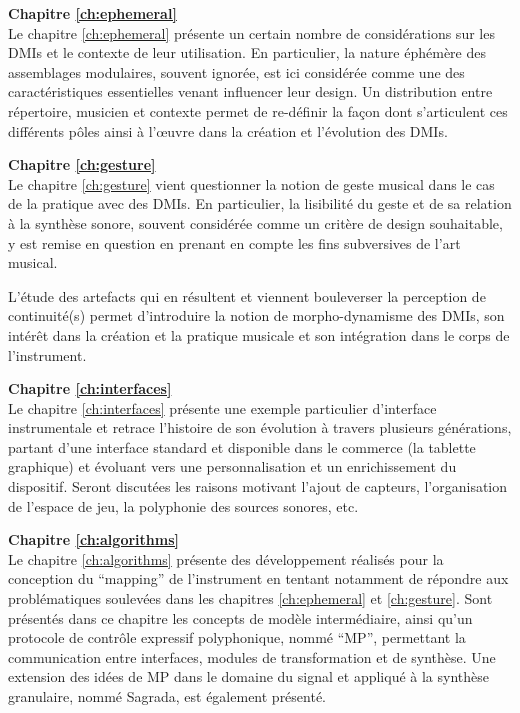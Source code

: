 \textbf{Chapitre \ref{ch:ephemeral}} \\[0.2em]
Le chapitre \ref{ch:ephemeral} présente un certain nombre de considérations sur les \glspl{DMI} et le contexte de leur utilisation. En particulier, la nature éphémère des assemblages modulaires, souvent ignorée, est ici considérée comme une des caractéristiques essentielles venant influencer leur design. Un distribution entre répertoire, musicien et contexte permet de re-définir la façon dont s'articulent ces différents pôles ainsi à l'œuvre dans la création et l'évolution des DMIs.

\textbf{Chapitre \ref{ch:gesture}} \\[0.2em]
Le chapitre \ref{ch:gesture} vient questionner la notion de geste musical dans le cas de la pratique avec des DMIs. En particulier, la lisibilité du geste et de sa relation à la synthèse sonore, souvent considérée comme un critère de design souhaitable, y est remise en question en prenant en compte les fins subversives de l'art musical. 

L'étude des artefacts qui en résultent et viennent bouleverser la perception de continuité(s) permet d'introduire la notion de morpho-dynamisme des DMIs, son intérêt dans la création et la pratique musicale et son intégration dans le corps de l'instrument.

\textbf{Chapitre \ref{ch:interfaces}} \\[0.2em]
Le chapitre \ref{ch:interfaces} présente une exemple particulier d'interface instrumentale et retrace l'histoire de son évolution à travers plusieurs générations, partant d'une interface standard et disponible dans le commerce (la tablette graphique) et évoluant vers une personnalisation et un enrichissement du dispositif. 
Seront discutées les raisons motivant l'ajout de capteurs, l'organisation de l'espace de jeu, la polyphonie des sources sonores, etc.

\textbf{Chapitre \ref{ch:algorithms}} \\[0.2em]
Le chapitre \ref{ch:algorithms} présente des développement réalisés pour la conception du ``mapping'' de l'instrument en tentant notamment de répondre aux problématiques soulevées dans les chapitres \ref{ch:ephemeral} et \ref{ch:gesture}. Sont présentés dans ce chapitre les concepts de modèle intermédiaire, ainsi qu'un protocole de contrôle expressif polyphonique, nommé ``MP'', permettant la communication entre interfaces, modules de transformation et de synthèse. Une extension des idées de MP dans le domaine du signal et appliqué à la synthèse granulaire, nommé Sagrada, est également présenté.

